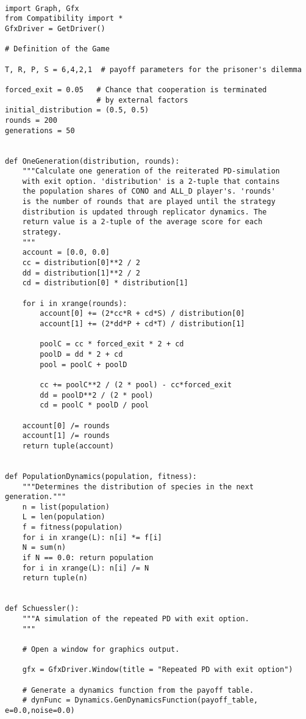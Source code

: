 \documentclass[12pt,a4paper,ngerman]{article}
\begin{document}
\begin{scriptsize}
\begin{verbatim}

import Graph, Gfx
from Compatibility import *
GfxDriver = GetDriver()

# Definition of the Game

T, R, P, S = 6,4,2,1  # payoff parameters for the prisoner's dilemma

forced_exit = 0.05   # Chance that cooperation is terminated 
                     # by external factors
initial_distribution = (0.5, 0.5)
rounds = 200
generations = 50


def OneGeneration(distribution, rounds):
    """Calculate one generation of the reiterated PD-simulation
    with exit option. 'distribution' is a 2-tuple that contains
    the population shares of CONO and ALL_D player's. 'rounds'
    is the number of rounds that are played until the strategy
    distribution is updated through replicator dynamics. The
    return value is a 2-tuple of the average score for each
    strategy.
    """
    account = [0.0, 0.0]
    cc = distribution[0]**2 / 2
    dd = distribution[1]**2 / 2
    cd = distribution[0] * distribution[1]
    
    for i in xrange(rounds):       
        account[0] += (2*cc*R + cd*S) / distribution[0]
        account[1] += (2*dd*P + cd*T) / distribution[1]

        poolC = cc * forced_exit * 2 + cd
        poolD = dd * 2 + cd
        pool = poolC + poolD
       
        cc += poolC**2 / (2 * pool) - cc*forced_exit
        dd = poolD**2 / (2 * pool)
        cd = poolC * poolD / pool
        
    account[0] /= rounds
    account[1] /= rounds
    return tuple(account)


def PopulationDynamics(population, fitness):
    """Determines the distribution of species in the next generation."""  
    n = list(population)
    L = len(population)
    f = fitness(population)
    for i in xrange(L): n[i] *= f[i]
    N = sum(n)
    if N == 0.0: return population
    for i in xrange(L): n[i] /= N
    return tuple(n)


def Schuessler():
    """A simulation of the repeated PD with exit option.
    """

    # Open a window for graphics output.
    
    gfx = GfxDriver.Window(title = "Repeated PD with exit option")

    # Generate a dynamics function from the payoff table.
    # dynFunc = Dynamics.GenDynamicsFunction(payoff_table, e=0.0,noise=0.0)


\end{verbatim}
\end{scriptsize}
\end{document}
